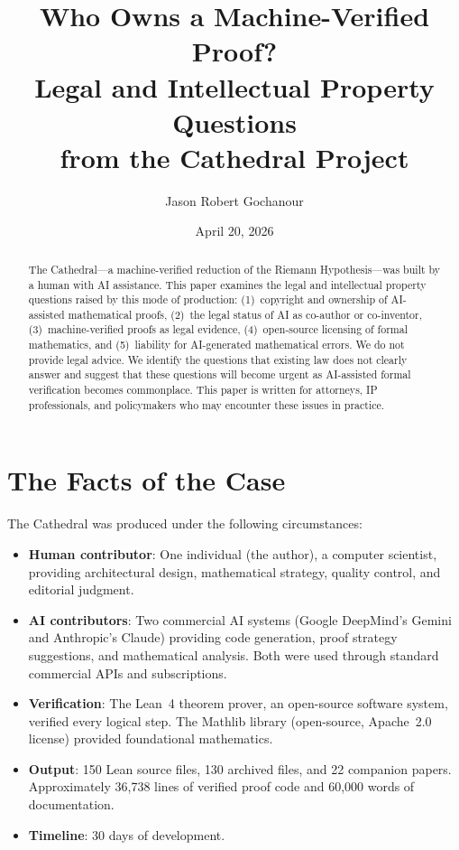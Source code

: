 \documentclass[11pt,a4paper]{article}
\title{%
  Who Owns a Machine-Verified Proof?\\
  Legal and Intellectual Property Questions\\
  from the Cathedral Project%
}
\author{
  Jason Robert Gochanour
}
\date{April 20, 2026}
\begin{document}
\maketitle

\begin{abstract}
The Cathedral---a machine-verified reduction of the Riemann
Hypothesis---was built by a human with AI assistance. This paper
examines the legal and intellectual property questions raised by
this mode of production: (1)~copyright and ownership of
AI-assisted mathematical proofs, (2)~the legal status of AI as
co-author or co-inventor, (3)~machine-verified proofs as legal
evidence, (4)~open-source licensing of formal mathematics, and
(5)~liability for AI-generated mathematical errors. We do not
provide legal advice. We identify the questions that existing law
does not clearly answer and suggest that these questions will
become urgent as AI-assisted formal verification becomes
commonplace. This paper is written for attorneys, IP professionals,
and policymakers who may encounter these issues in practice.
\end{abstract}

\tableofcontents

\section{The Facts of the Case}

The Cathedral was produced under the following circumstances:

\begin{itemize}
  \item \textbf{Human contributor}: One individual (the author),
    a computer scientist, providing architectural design,
    mathematical strategy, quality control, and editorial judgment.

  \item \textbf{AI contributors}: Two commercial AI systems
    (Google DeepMind's Gemini and Anthropic's Claude) providing
    code generation, proof strategy suggestions, and mathematical
    analysis. Both were used through standard commercial APIs and
    subscriptions.

  \item \textbf{Verification}: The Lean~4 theorem prover, an
    open-source software system, verified every logical step.
    The Mathlib library (open-source, Apache~2.0 license) provided
    foundational mathematics.

  \item \textbf{Output}: 150 Lean source files, 130 archived files,
    and 22 companion papers. Approximately 36,738 lines of
    verified proof code and 60,000 words of documentation.

  \item \textbf{Timeline}: 30 days of development.
\end{itemize}
\end{document}
